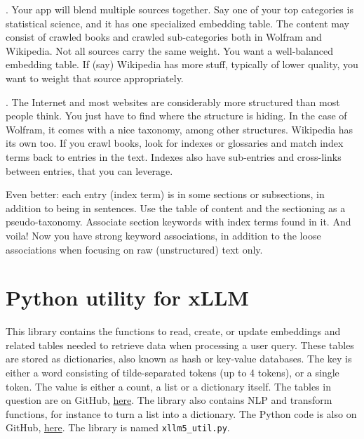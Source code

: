 \documentclass[oneside,10pt]{book}
\begin{document}
\vspace{1ex}
. Your app will blend multiple sources together. Say one of your top categories is statistical science, and it has one specialized embedding table. The content may consist of crawled books and crawled sub-categories both in Wolfram and Wikipedia. Not all sources carry the same weight. You want a well-balanced embedding table. If (say) Wikipedia has more stuff, typically of lower quality, you want to weight that source appropriately.

\vspace{1ex}
. The Internet and most websites are considerably more structured than most people think. You just have to find where the structure is hiding. In the case of Wolfram, it comes with a nice taxonomy, among other structures. Wikipedia has its own too. If you crawl books, look for indexes or glossaries and match index terms back to entries in the text. Indexes also have sub-entries and cross-links between entries, that you can leverage.

Even better: each entry (index term) is in some sections or subsections, in addition to being in sentences. Use the table of content and the sectioning as a pseudo-taxonomy. Associate section keywords with index terms found in it. And voila! Now you have strong keyword associations, in addition to the loose associations when focusing on raw (unstructured) text only.




\section{Python utility for xLLM}\label{xllm5util}

This library contains the functions to read, create, or update embeddings and related tables needed to retrieve data 
 when processing a user query. These tables are stored as dictionaries, also known as hash or key-value databases. The key is either a word consisting of tilde-separated tokens (up to 4 tokens), or a single token. 
The value is either a count, a list or a dictionary itself. 
The tables in question are on GitHub, \href{https://github.com/VincentGranville/Large-Language-Models/tree/main/xllm5}{here}.
The library also contains NLP and transform functions, for instance to turn a list into a dictionary. 
The Python code is also on GitHub, \href{https://github.com/VincentGranville/Large-Language-Models/blob/main/xllm5/xllm5_util.py}{here}.
The library is named \texttt{xllm5\_util.py}.
\vspace{1ex}
\end{document}

